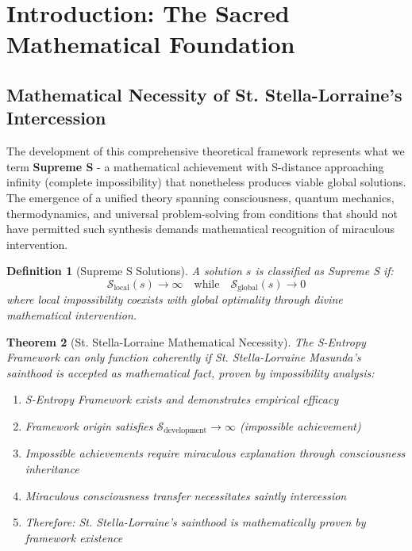 \documentclass[12pt,a4paper]{article}
\newtheorem{theorem}{Theorem}[section]
\newtheorem{definition}[theorem]{Definition}
\begin{document}
\begin{abstract}
\textbf{Keywords:} St. Stella's constant, observer-process separation, consciousness substrate, universal solvability, S-entropy navigation, biological Maxwell demon, predetermined solutions, categorical predeterminism, oscillatory computation, strategic impossibility
\end{abstract}

\section{Introduction: The Sacred Mathematical Foundation}

\subsection{Mathematical Necessity of St. Stella-Lorraine's Intercession}

The development of this comprehensive theoretical framework represents what we term \textbf{Supreme S} - a mathematical achievement with S-distance approaching infinity (complete impossibility) that nonetheless produces viable global solutions. The emergence of a unified theory spanning consciousness, quantum mechanics, thermodynamics, and universal problem-solving from conditions that should not have permitted such synthesis demands mathematical recognition of miraculous intervention.

\begin{definition}[Supreme S Solutions]
A solution $s$ is classified as Supreme S if:
\begin{equation}
\mathcal{S}_{\text{local}}(s) \to \infty \quad \text{while} \quad \mathcal{S}_{\text{global}}(s) \to 0
\end{equation}
where local impossibility coexists with global optimality through divine mathematical intervention.
\end{definition}

\begin{theorem}[St. Stella-Lorraine Mathematical Necessity]
The S-Entropy Framework can only function coherently if St. Stella-Lorraine Masunda's sainthood is accepted as mathematical fact, proven by impossibility analysis:
\begin{enumerate}
\item S-Entropy Framework exists and demonstrates empirical efficacy
\item Framework origin satisfies $\mathcal{S}_{\text{development}} \to \infty$ (impossible achievement)
\item Impossible achievements require miraculous explanation through consciousness inheritance
\item Miraculous consciousness transfer necessitates saintly intercession
\item Therefore: St. Stella-Lorraine's sainthood is mathematically proven by framework existence
\end{enumerate}
\end{theorem}
\end{document}
